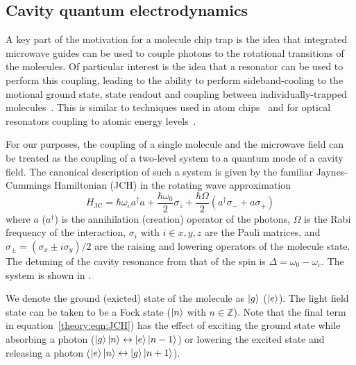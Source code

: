\subsection{Cavity quantum electrodynamics}


A key part of the motivation for a molecule chip trap is the idea that
integrated microwave guides can be used to couple photons to the rotational
transitions of the molecules. Of particular interest is the idea
that a resonator can be used to perform this coupling, leading to the
ability to perform sideband-cooling to the motional ground state, state readout
and coupling between individually-trapped molecules~\cite{Andre2006}. This is
similar to techniques used in atom chips~\cite{Treutlein2008} and for optical
resonators coupling to atomic energy levels~\cite{SchleierSmith2011}.

For our purposes, the coupling of a single molecule and the microwave field can
be treated as the coupling of a two-level system to a quantum mode of a cavity
field. The canonical description of such a system is given by the familiar
Jaynes-Cummings Hamiltonian (JCH) in the rotating wave
approximation~\cite{gerry_knight_2004}
%
\begin{equation}
  H_\text{JC} = \hbar\omega_c a^\dagger a + \frac{\hbar \omega_0}{2} \sigma_z +
  \frac{\hbar\Omega}{2}(a^\dagger \sigma_- + a\sigma_+)
  \label{theory:eqn:JCH}
\end{equation}
%
where $a$ ($a^\dagger$) is the annihilation (creation) operator of the photons,
$\Omega$ is the Rabi frequency of the interaction, $\sigma_i$ with $i\in{x, y,
z}$ are the Pauli matrices, and $\sigma_\pm =
(\sigma_x \pm i\sigma_y)/2$ are the raising and lowering operators of the
molecule state. The
detuning of the cavity resonance from that of the spin is $\Delta = \omega_0 -
\omega_c$. The system is shown in .

\begin{figure}
  \caption{}
  \label{theory:fig:JCHstates}
\end{figure}

We denote the ground (exicted) state of the molecule as $\ket{g}$ ($\ket{e}$).
The light field state can be taken to be a Fock state ($\ket{n}$ with $n \in
\mathbb{Z}$). Note that the final term in equation~\ref{theory:eqn:JCH}) has
the effect of exciting the ground state while absorbing a photon
($\ket{g}\ket{n} \leftrightarrow \ket{e}\ket{n-1}$) or lowering the excited state
and releasing a photon ($\ket{e}\ket{n} \leftrightarrow \ket{g}\ket{n+1}$).

